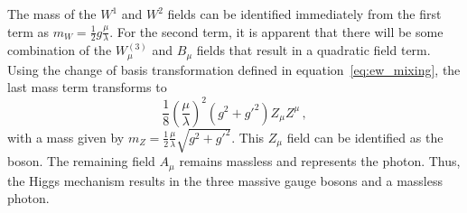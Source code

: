 The mass of the $W^1$ and $W^2$ fields can be identified immediately from the first term as $m_W=\frac{1}{2}g\frac{\mu}{\lambda}$. For the second term, it is apparent that there will be some combination of the $W_\mu^{(3)}$ and $B_\mu$ fields that result in a quadratic field term. Using the change of basis transformation defined in equation~\ref{eq:ew_mixing}, the last mass term transforms to
\begin{equation}
	\frac{1}{8}\left(\frac{\mu}{\lambda}\right)^2(g^2+g'^2)Z_\mu Z^\mu\,,
\end{equation}
with a mass given by $m_Z=\frac{1}{2}\frac{\mu}{\lambda}\sqrt{g^2+g'^2}$. This $Z_\mu$ field can be identified as the \PZ boson. The remaining field $A_\mu$ remains massless and represents the photon. Thus, the Higgs mechanism results in the three massive gauge bosons and a massless photon.

